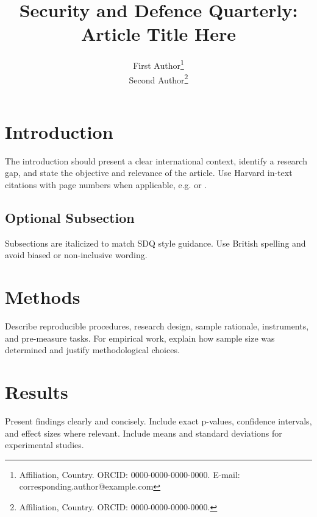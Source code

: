\documentclass[12pt,a4paper]{article}
\title{Security and Defence Quarterly: Article Title Here}
\author{First Author\footnote{Affiliation, Country. ORCID: 0000-0000-0000-0000. E-mail: corresponding.author@example.com} \\ Second Author\footnote{Affiliation, Country. ORCID: 0000-0000-0000-0000.}}
\date{}
\begin{document}
\maketitle

\begin{sdqabstract}
\end{sdqabstract}


\section{Introduction}
The introduction should present a clear international context, identify a research gap, and state the objective and relevance of the article. Use Harvard in-text citations with page numbers when applicable, e.g. \parencite[p.\ 14]{storey2013} or \parencite[pp.\ 13--15]{tan2012}.

\subsection{Optional Subsection}
Subsections are italicized to match SDQ style guidance. Use British spelling and avoid biased or non-inclusive wording.

\section{Methods}
Describe reproducible procedures, research design, sample rationale, instruments, and pre-measure tasks. For empirical work, explain how sample size was determined and justify methodological choices.

\section{Results}
Present findings clearly and concisely. Include exact p-values, confidence intervals, and effect sizes where relevant. Include means and standard deviations for experimental studies.
\end{document}
